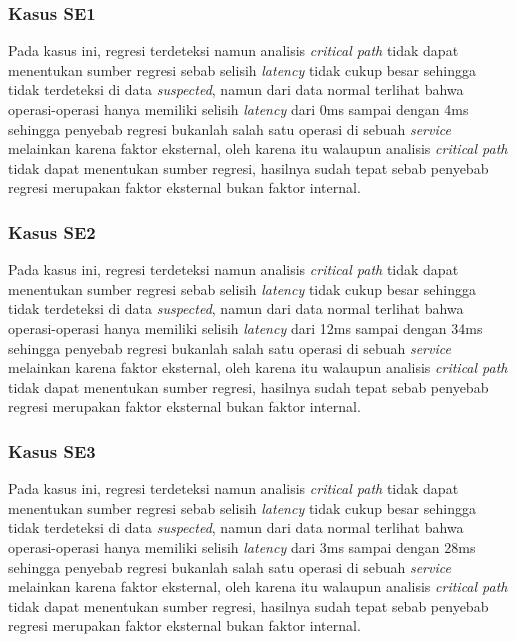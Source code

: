 \subsubsection{Kasus SE1}
Pada kasus ini, regresi terdeteksi namun analisis \textit{critical path} tidak dapat menentukan sumber regresi sebab selisih \textit{latency} tidak cukup besar sehingga tidak terdeteksi di data \textit{suspected}, namun dari data normal terlihat bahwa operasi-operasi hanya memiliki selisih \textit{latency} dari 0ms sampai dengan 4ms sehingga penyebab regresi bukanlah salah satu operasi di sebuah \textit{service} melainkan karena faktor eksternal, oleh karena itu walaupun analisis \textit{critical path} tidak dapat menentukan sumber regresi, hasilnya sudah tepat sebab penyebab regresi merupakan faktor eksternal bukan faktor internal.

\subsubsection{Kasus SE2}
Pada kasus ini, regresi terdeteksi namun analisis \textit{critical path} tidak dapat menentukan sumber regresi sebab selisih \textit{latency} tidak cukup besar sehingga tidak terdeteksi di data \textit{suspected}, namun dari data normal terlihat bahwa operasi-operasi hanya memiliki selisih \textit{latency} dari 12ms sampai dengan 34ms sehingga penyebab regresi bukanlah salah satu operasi di sebuah \textit{service} melainkan karena faktor eksternal, oleh karena itu walaupun analisis \textit{critical path} tidak dapat menentukan sumber regresi, hasilnya sudah tepat sebab penyebab regresi merupakan faktor eksternal bukan faktor internal.

\subsubsection{Kasus SE3}
Pada kasus ini, regresi terdeteksi namun analisis \textit{critical path} tidak dapat menentukan sumber regresi sebab selisih \textit{latency} tidak cukup besar sehingga tidak terdeteksi di data \textit{suspected}, namun dari data normal terlihat bahwa operasi-operasi hanya memiliki selisih \textit{latency} dari 3ms sampai dengan 28ms sehingga penyebab regresi bukanlah salah satu operasi di sebuah \textit{service} melainkan karena faktor eksternal, oleh karena itu walaupun analisis \textit{critical path} tidak dapat menentukan sumber regresi, hasilnya sudah tepat sebab penyebab regresi merupakan faktor eksternal bukan faktor internal.
 
